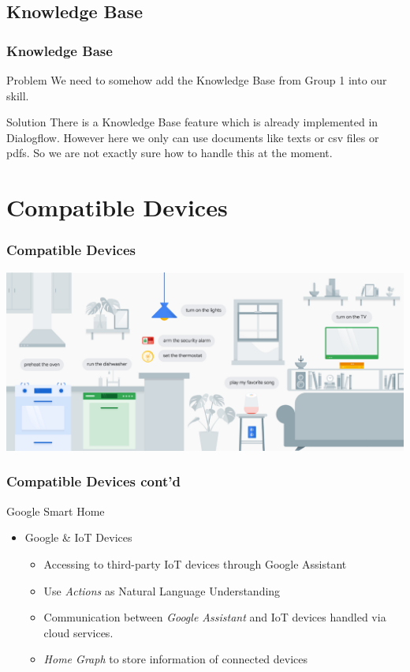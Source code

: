 \documentclass{beamer}
\begin{document}

\subsection{Knowledge Base}

\begin{frame}
\frametitle{Knowledge Base}
\begin{block}{Problem}
We need to somehow add the Knowledge Base from Group 1 into our skill.
\end{block}


\begin{block}{Solution}
There is a Knowledge Base feature which is already implemented in Dialogflow. However here we only can use documents like texts or csv files or pdfs. So we are not exactly sure how to handle this at the moment.
\end{block}

\end{frame}


\section{Compatible Devices}

\begin{frame}
\frametitle{Compatible Devices}
\begin{center}
\includegraphics[scale=0.30]{pictures/smart_home.png} 
\end{center}
\end{frame}

\begin{frame}
\frametitle{Compatible Devices cont'd}
\begin{block}{Google Smart Home}
\begin{itemize}
\item Google \& IoT Devices
\begin{itemize}
\item Accessing to third-party IoT devices through Google Assistant
\item Use \textit{Actions} as Natural Language Understanding
\item Communication between \textit{Google Assistant} and IoT devices handled via cloud services.
\item \textit{Home Graph} to store information of connected devices
\end{itemize}
\end{itemize}
\end{block}
\end{frame}
\end{document}
